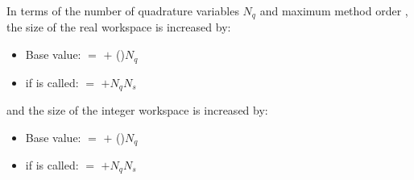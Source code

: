 In terms of the number of quadrature variables $N_q$ and maximum method order ,
the size of the real workspace is increased by:
\begin{itemize}
\item Base value:  $=$  $+$ ()$N_q$
\item if  is called:  $=$  $+ N_q N_s$ 
\end{itemize}
and the size of the integer workspace is increased by:
\begin{itemize}
\item Base value:  $=$  $+$ ()$N_q$
\item if  is called:  $=$  $+ N_q N_s$ 
\end{itemize}

